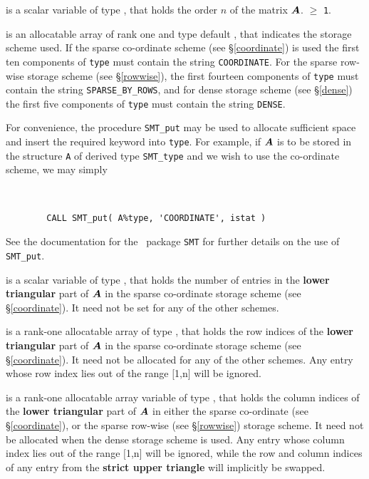 \documentclass{galahad}
\begin{document}
\begin{description}

 is a scalar variable of type \integer, that holds
the order $n$ of the matrix  ${\bm{A}}$.
 $\geq$ {\tt 1}.

 is an allocatable array of rank one and type default \character, that
indicates the storage scheme used. If the
sparse co-ordinate scheme (see \S\ref{coordinate}) is used
the first ten components of {\tt type} must contain the
string {\tt COORDINATE}.
For the sparse row-wise storage scheme (see \S\ref{rowwise}),
the first fourteen components of {\tt type} must contain the
string {\tt SPARSE\_BY\_ROWS}, and
for dense storage scheme (see \S\ref{dense})
the first five components of {\tt type} must contain the
string {\tt DENSE}.

For convenience, the procedure {\tt SMT\_put}
may be used to allocate sufficient space and insert the required keyword
into {\tt type}.
For example, if ${\bm{A}}$ is to be stored in the structure {\tt A}
of derived type {\tt SMT\_type} and we wish to use
the co-ordinate scheme, we may simply
{\tt
\begin{verbatim}
        CALL SMT_put( A%type, 'COORDINATE', istat )
\end{verbatim}
}
\noindent
See the documentation for the \galahad\ package {\tt SMT}
for further details on the use of {\tt SMT\_put}.

 is a scalar variable of type \integer, that
holds the number of entries in the {\bf lower triangular} part of ${\bm{A}}$
in the sparse co-ordinate storage scheme (see \S\ref{coordinate}).
It need not be set for any of the other schemes.

 is a rank-one allocatable array of type \integer,
that holds the row indices of the {\bf lower triangular} part of ${\bm{A}}$
in the sparse co-ordinate storage
scheme (see \S\ref{coordinate}).
It need not be allocated for any of the other schemes.
Any entry whose row index lies out of the range $[$1,n$]$ will be ignored.

 is a rank-one allocatable array variable of type \integer,
that holds the column indices of the {\bf lower triangular} part of
${\bm{A}}$ in either the sparse co-ordinate
(see \S\ref{coordinate}), or the sparse row-wise
(see \S\ref{rowwise}) storage scheme.
It need not be allocated when the dense
storage scheme is used.
Any entry whose column index lies out of the range $[$1,n$]$ will be ignored,
while the row and column indices of any entry from the
{\bf strict upper triangle} will implicitly be swapped.


\end{description}
\end{document}
